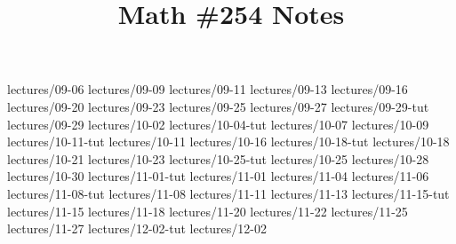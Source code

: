 \documentclass{scrartcl}
\title{Math \#254 Notes}
\begin{document}
\maketitle

\clearpage
\tableofcontents



{lectures/09-06}
{lectures/09-09}
{lectures/09-11}
{lectures/09-13}
{lectures/09-16}
{lectures/09-20}
{lectures/09-23}
{lectures/09-25}
{lectures/09-27}
{lectures/09-29-tut}
{lectures/09-29}
{lectures/10-02}
{lectures/10-04-tut}
{lectures/10-07}
{lectures/10-09}
{lectures/10-11-tut}
{lectures/10-11}
{lectures/10-16}
{lectures/10-18-tut}
{lectures/10-18}
{lectures/10-21}
{lectures/10-23}
{lectures/10-25-tut}
{lectures/10-25}
{lectures/10-28}
{lectures/10-30}
{lectures/11-01-tut}
{lectures/11-01}
{lectures/11-04}
{lectures/11-06}
{lectures/11-08-tut}
{lectures/11-08}
{lectures/11-11}
{lectures/11-13}
{lectures/11-15-tut}
{lectures/11-15}
{lectures/11-18}
{lectures/11-20}
{lectures/11-22}
{lectures/11-25}
{lectures/11-27}
{lectures/12-02-tut}
{lectures/12-02}
\end{document}
